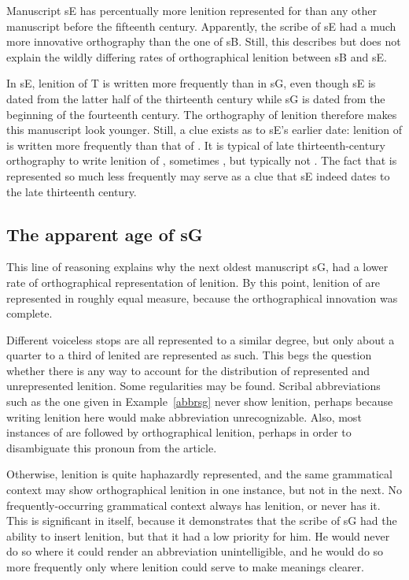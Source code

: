Manuscript \gls{sE} has percentually more lenition represented for  than any other manuscript before the fifteenth century. Apparently, the scribe of \gls{sE} had a much more innovative orthography than the one of \gls{sB}. Still, this describes but does not explain the wildly differing rates of orthographical lenition between \gls{sB} and \gls{sE}.

In \gls{sE}, lenition of \gls{T} is written more frequently than in \gls{sG}, even though \gls{sE} is dated from the latter half of the thirteenth century while \gls{sG} is dated from the beginning of the fourteenth century. The orthography of lenition therefore makes this manuscript look younger. Still, a clue exists as to \gls{sE}'s earlier date: lenition of  is written  more frequently than that of . It is typical of late thirteenth-century orthography to write lenition of , sometimes , but typically not . The fact that  is represented so much less frequently may serve as a clue that \gls{sE} indeed dates to the late thirteenth century.


\subsection{The apparent age of \gls{sG}}
\label{sec:apparent-age-glssg}

This line of reasoning explains why the next oldest manuscript \gls{sG}, had a lower rate of orthographical representation of lenition. By this point, lenition of  are represented in roughly equal measure, because the orthographical innovation was complete. 

Different voiceless stops are all represented to a similar degree, but only about a quarter to a third of lenited  are represented as such. This begs the question whether there is any way to account for the distribution of represented and unrepresented lenition. Some regularities may be found. Scribal abbreviations such as the one given in Example~\ref{abbrsg} never show lenition, perhaps because writing lenition here would make abbreviation unrecognizable.
Also, most instances of  are followed by orthographical lenition, perhaps in order to disambiguate this pronoun from the article.

Otherwise, lenition is quite haphazardly represented, and the same grammatical context may show orthographical lenition in one instance, but not in the next. No frequently-occurring grammatical context always has lenition, or never has it. This is significant in itself, because it demonstrates that the scribe of \gls{sG} had the ability to insert lenition, but that it had a low priority for him. He would never do so where it could render an abbreviation unintelligible, and he would do so more frequently only where lenition could serve to make meanings clearer.

